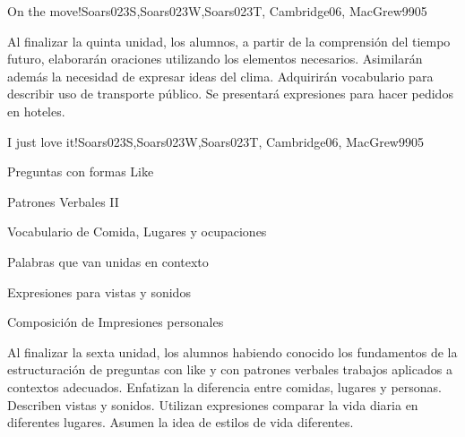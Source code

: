 \begin{syllabus}
\begin{unit}{On the move!}{Soars023S,Soars023W,Soars023T, Cambridge06, MacGrew99}{0}{5}
   \begin{learningoutcomes}
      \item Al finalizar la quinta unidad, los alumnos, a partir de la comprensión del tiempo futuro, elaborarán oraciones utilizando los elementos necesarios. Asimilarán además la necesidad de expresar ideas del clima. Adquirirán vocabulario para describir uso de transporte público. Se presentará expresiones para hacer pedidos en hoteles.
   \end{learningoutcomes}

\end{unit}

\begin{unit}{I just love it!}{Soars023S,Soars023W,Soars023T, Cambridge06, MacGrew99}{0}{5}
   \begin{topics}
      \item Preguntas con formas Like
      \item Patrones Verbales II
      \item Vocabulario de Comida, Lugares y ocupaciones
      \item Palabras que van unidas en contexto
      \item Expresiones para vistas y sonidos
      \item Composición de Impresiones personales
   \end{topics}

   \begin{learningoutcomes}
      \item Al finalizar la sexta unidad, los alumnos habiendo conocido los fundamentos de la estructuración de preguntas con like y con patrones verbales trabajos aplicados a contextos adecuados. Enfatizan la diferencia entre comidas, lugares y personas. Describen vistas y sonidos. Utilizan expresiones comparar la vida diaria en diferentes lugares. Asumen la idea de estilos de vida diferentes.
   \end{learningoutcomes}
\end{unit}

\begin{coursebibliography}
\end{coursebibliography}

\end{syllabus}
